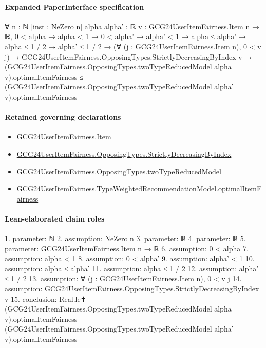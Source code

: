 \documentclass[10pt]{article}
\begin{document}
\paragraph{Expanded PaperInterface specification}
\begin{ReviewVerbatim}
∀ {n : ℕ} [inst : NeZero n] {alpha alpha' : ℝ} {v : GCG24UserItemFairness.Item n → ℝ},
  0 < alpha →
    alpha < 1 →
      0 < alpha' →
        alpha' < 1 →
          alpha ≤ alpha' →
            alpha ≤ 1 / 2 →
              alpha' ≤ 1 / 2 →
                (∀ (j : GCG24UserItemFairness.Item n), 0 < v j) →
                  GCG24UserItemFairness.OpposingTypes.StrictlyDecreasingByIndex v →
                    (GCG24UserItemFairness.OpposingTypes.twoTypeReducedModel alpha v).optimalItemFairness ≤
                      (GCG24UserItemFairness.OpposingTypes.twoTypeReducedModel alpha' v).optimalItemFairness
\end{ReviewVerbatim}

\paragraph{Retained governing declarations}
\begin{itemize}\raggedright
\item \hyperlink{governing-declaration-a7c560a429c6e204}{GCG24\allowbreak{}User\allowbreak{}Item\allowbreak{}Fairness.\allowbreak{}Item}
\item \hyperlink{governing-declaration-8278344d2ddef9a8}{GCG24\allowbreak{}User\allowbreak{}Item\allowbreak{}Fairness.\allowbreak{}Opposing\allowbreak{}Types.\allowbreak{}Strictly\allowbreak{}Decreasing\allowbreak{}By\allowbreak{}Index}
\item \hyperlink{governing-declaration-b87168913e966e7f}{GCG24\allowbreak{}User\allowbreak{}Item\allowbreak{}Fairness.\allowbreak{}Opposing\allowbreak{}Types.\allowbreak{}two\allowbreak{}Type\allowbreak{}Reduced\allowbreak{}Model}
\item \hyperlink{governing-declaration-fc7d3f75e1b48fb3}{GCG24\allowbreak{}User\allowbreak{}Item\allowbreak{}Fairness.\allowbreak{}Type\allowbreak{}Weighted\allowbreak{}Recommendation\allowbreak{}Model.\allowbreak{}optimal\allowbreak{}Item\allowbreak{}Fairness}
\end{itemize}
\paragraph{Lean-elaborated claim roles}\begin{ReviewVerbatim}
1. parameter: ℕ
2. assumption: NeZero n
3. parameter: ℝ
4. parameter: ℝ
5. parameter: GCG24UserItemFairness.Item n → ℝ
6. assumption: 0 < alpha
7. assumption: alpha < 1
8. assumption: 0 < alpha'
9. assumption: alpha' < 1
10. assumption: alpha ≤ alpha'
11. assumption: alpha ≤ 1 / 2
12. assumption: alpha' ≤ 1 / 2
13. assumption: ∀ (j : GCG24UserItemFairness.Item n), 0 < v j
14. assumption: GCG24UserItemFairness.OpposingTypes.StrictlyDecreasingByIndex v
15. conclusion: Real.le✝ (GCG24UserItemFairness.OpposingTypes.twoTypeReducedModel alpha v).optimalItemFairness
  (GCG24UserItemFairness.OpposingTypes.twoTypeReducedModel alpha' v).optimalItemFairness
\end{ReviewVerbatim}
\end{document}
